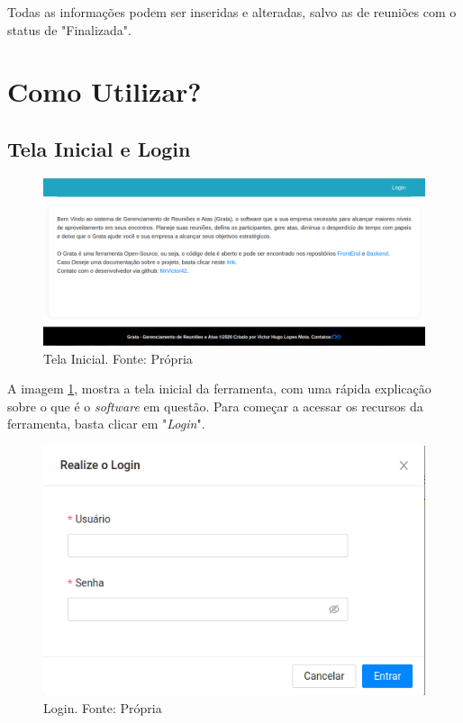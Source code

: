 Todas as informações podem ser inseridas e alteradas, salvo as de reuniões com o status de "Finalizada".

\section{Como Utilizar?}

\subsection{Tela Inicial e Login}

\begin{figure}[H]
    \centering
    \includegraphics[width=1.0\textwidth]{figuras/tela_inicial.png}
    \caption{Tela Inicial. Fonte: Própria}
    \label{img:tela_inicial}
\end{figure}

A imagem \ref{img:tela_inicial}, mostra a tela inicial da ferramenta, com uma rápida explicação sobre o que é o \textit{software} em questão. Para começar a acessar os recursos da ferramenta, basta clicar em "\textit{Login}".

\begin{figure}[H]
    \centering
    \includegraphics[width=1.0\textwidth]{figuras/tela_login.png}
    \caption{Login. Fonte: Própria}
    \label{img:tela_login}
\end{figure}

